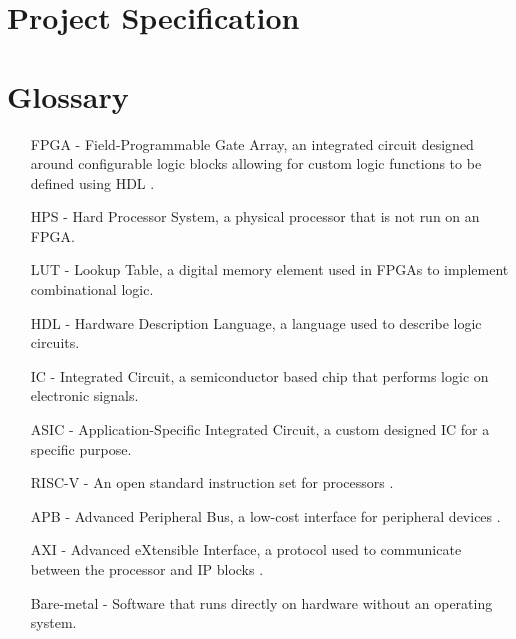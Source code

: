 \documentclass[a4paper,fleqn,12pt]{article}
\begin{document}


\pagestyle{plain}





\newpage
\appendix

\section{Project Specification}


\section{Glossary}
\begin{enumerate}
	\item [ FPGA - ] Field-Programmable Gate Array, an integrated circuit designed around configurable logic blocks allowing for custom logic functions to be defined using HDL \cite{whatisanfpga}.
	\item [ HPS - ] Hard Processor System, a physical processor that is not run on an FPGA.
	\item [ LUT - ] Lookup Table, a digital memory element used in FPGAs to implement combinational logic.
	\item [ HDL - ] Hardware Description Language, a language used to describe logic circuits.
	\item [ IC - ] Integrated Circuit, a semiconductor based chip that performs logic on electronic signals.
	\item [ ASIC - ] Application-Specific Integrated Circuit, a custom designed IC for a specific purpose.
	\item [ RISC-V - ] An open standard instruction set for processors \cite{risc}.
	\item [ APB - ] Advanced Peripheral Bus, a low-cost interface for peripheral devices \cite{APB}.
	\item [ AXI - ]  Advanced eXtensible Interface, a protocol used to communicate between the processor and IP blocks \cite{axi}.
	\item [ Bare-metal - ] Software that runs directly on hardware without an operating system.
\end{enumerate}



\end{document}
